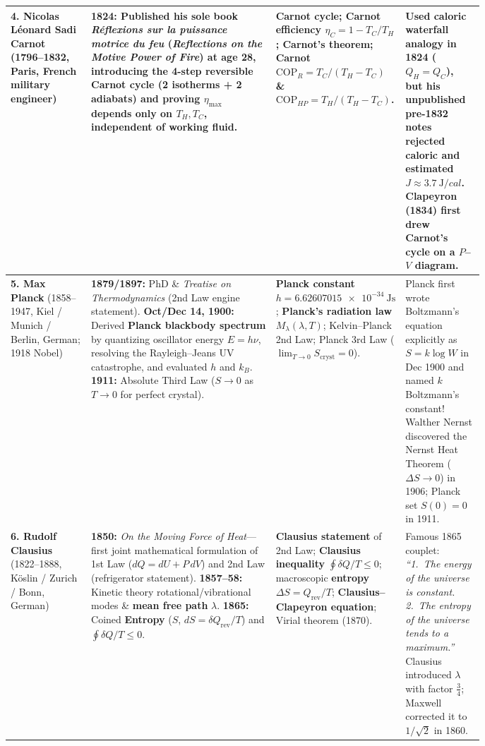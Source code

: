 \begin{center}
\begin{tabularx}{\linewidth}{@{}>{\raggedright\arraybackslash}p{0.17\linewidth} >{\raggedright\arraybackslash}p{0.39\linewidth} >{\raggedright\arraybackslash}p{0.22\linewidth} >{\raggedright\arraybackslash}X@{}}
\textbf{4. Nicolas L\'eonard Sadi Carnot} (1796--1832, Paris, French military engineer) & \textbf{1824:} Published his sole book \emph{R\'eflexions sur la puissance motrice du feu} (\emph{Reflections on the Motive Power of Fire}) at age 28, introducing the 4-step reversible Carnot cycle (2 isotherms + 2 adiabats) and proving $\eta_{\max}$ depends only on $T_H, T_C$, independent of working fluid. & \textbf{Carnot cycle}; \textbf{Carnot efficiency} $\eta_C = 1 - T_C/T_H$; \textbf{Carnot's theorem}; Carnot $\mathrm{COP}_R = T_C/(T_H-T_C)$ \& $\mathrm{COP}_{HP} = T_H/(T_H-T_C)$. & Used caloric waterfall analogy in 1824 ($Q_H = Q_C$), but his unpublished pre-1832 notes rejected caloric and estimated $J \approx \SI{3.7}{\joule/cal}$. Clapeyron (1834) first drew Carnot's cycle on a $P$--$V$ diagram. \\\midrule
\textbf{5. Max Planck} (1858--1947, Kiel / Munich / Berlin, German; 1918 Nobel) & \textbf{1879/1897:} PhD \& \emph{Treatise on Thermodynamics} (2nd Law engine statement). \textbf{Oct/Dec 14, 1900:} Derived \textbf{Planck blackbody spectrum} by quantizing oscillator energy $E = h\nu$, resolving the Rayleigh--Jeans UV catastrophe, and evaluated $h$ and $k_B$. \textbf{1911:} Absolute Third Law ($S \to 0$ as $T \to 0$ for perfect crystal). & \textbf{Planck constant} $h = \SI{6.62607015e-34}{\joule\second}$; \textbf{Planck's radiation law} $M_\lambda(\lambda,T)$; Kelvin--Planck 2nd Law; Planck 3rd Law ($\lim_{T\to 0}S_{\mathrm{cryst}} = 0$). & Planck first wrote Boltzmann's equation explicitly as $S = k\log W$ in Dec 1900 and named $k$ Boltzmann's constant! Walther Nernst discovered the Nernst Heat Theorem ($\Delta S \to 0$) in 1906; Planck set $S(0)=0$ in 1911. \\\midrule
\textbf{6. Rudolf Clausius} (1822--1888, K\"oslin / Zurich / Bonn, German) & \textbf{1850:} \emph{On the Moving Force of Heat}---first joint mathematical formulation of 1st Law ($dQ = dU + P\,dV$) and 2nd Law (refrigerator statement). \textbf{1857--58:} Kinetic theory rotational/vibrational modes \& \textbf{mean free path} $\lambda$. \textbf{1865:} Coined \textbf{Entropy} ($S$, $dS = \delta Q_{\mathrm{rev}}/T$) and $\oint \delta Q/T \leq 0$. & \textbf{Clausius statement} of 2nd Law; \textbf{Clausius inequality} $\oint \delta Q/T \leq 0$; macroscopic \textbf{entropy} $\Delta S = Q_{\mathrm{rev}}/T$; \textbf{Clausius--Clapeyron equation}; Virial theorem (1870). & Famous 1865 couplet: \emph{``1.~The energy of the universe is constant. 2.~The entropy of the universe tends to a maximum.''} Clausius introduced $\lambda$ with factor $\tfrac{3}{4}$; Maxwell corrected it to $1/\sqrt{2}$ in 1860. \\\midrule

\end{tabularx}
\end{center}
